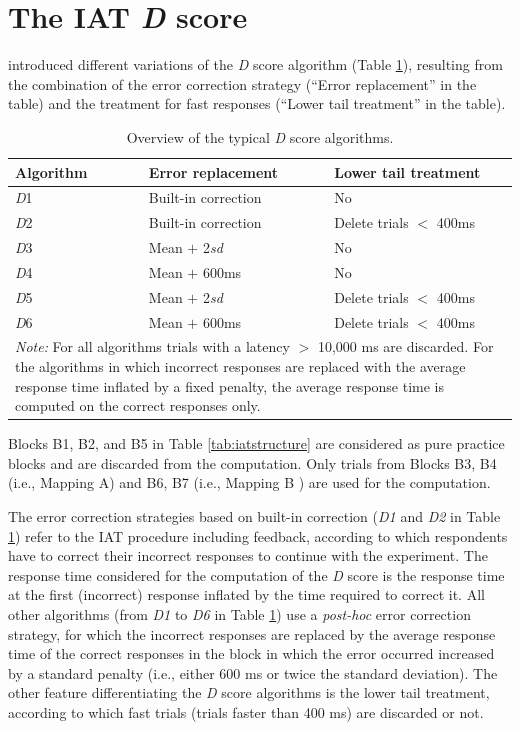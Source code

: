 \documentclass[12pt]{book}
\begin{document}
\section{The IAT \emph{D} score}\label{sec:iatD}
 introduced different variations of the \emph{D} score algorithm (Table \ref{tab:Doverview}), resulting from the combination of the error correction strategy (``Error replacement'' in the table) and the treatment for fast responses (``Lower tail treatment'' in the table).
\begin{table}[th!]
	\centering \doublespacing
	\caption{\label{tab:Doverview} Overview of the typical \emph{D} score algorithms. }
	\begin{tabularx}{\textwidth}{p{4cm} p{4cm} p{4cm}}
		\toprule
		Algorithm & Error replacement & Lower tail treatment\\\hline
		\emph{D}1 & Built-in correction & No \\
		\emph{D}2 & Built-in correction & Delete trials $<$ 400ms \\
		\emph{D}3 & Mean $+$ 2\emph{sd} & No\\
		\emph{D}4 & Mean $+$ 600ms & No \\
		\emph{D}5 & Mean $+$ 2\emph{sd} & Delete trials $<$ 400ms\\
		\emph{D}6 & Mean $+$ 600ms & Delete trials $<$ 400ms \\
		\bottomrule
		\multicolumn{3}{p{\textwidth}}{\onehalfspacing\emph{Note:} For all algorithms trials with a latency $>$ 10,000 ms are discarded. For the algorithms in which incorrect responses are replaced with the average response time inflated by a fixed penalty, the average response time is computed on the correct responses only.}
	\end{tabularx}
\end{table}

Blocks B1, B2, and B5 in Table \ref{tab:iatstructure} are considered as pure practice blocks and are discarded from the computation. Only trials from Blocks B3, B4 (i.e., Mapping A) and B6, B7 (i.e., Mapping B ) are used for the computation.  

The error correction strategies based on built-in correction (\emph{D1} and \emph{D2} in Table \ref{tab:Doverview}) refer to the IAT procedure including feedback, according to which  respondents have to correct their incorrect responses to continue with the experiment. 
The response time considered for the computation of the \emph{D} score is the response time at the first (incorrect) response inflated by the time required to correct it. All other algorithms (from \emph{D1} to \emph{D6} in Table \ref{tab:Doverview}) use a \emph{post-hoc} error correction strategy, for which the incorrect responses are replaced by the average response time of the correct responses in the block in which the error occurred increased by a standard penalty (i.e., either 600 ms or twice the standard deviation).
The other feature differentiating the \emph{D} score algorithms is the lower tail treatment, according to which fast trials (trials faster than 400 ms) are discarded or not.
\end{document}
